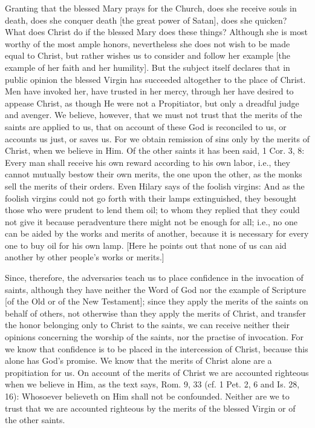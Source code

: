 Granting that the blessed Mary prays for the Church, does she receive
souls in death, does she conquer death [the great power of Satan],
does she quicken?  What does Christ do if the blessed Mary does these
things?  Although she is most worthy of the most ample honors,
nevertheless she does not wish to be made equal to Christ, but rather
wishes us to consider and follow her example [the example of her
faith and her humility].  But the subject itself declares that in
public opinion the blessed Virgin has succeeded altogether to the
place of Christ.  Men have invoked her, have trusted in her mercy,
through her have desired to appease Christ, as though He were not a
Propitiator, but only a dreadful judge and avenger.  We believe,
however, that we must not trust that the merits of the saints are
applied to us, that on account of these God is reconciled to us, or
accounts us just, or saves us.  For we obtain remission of sins only
by the merits of Christ, when we believe in Him.  Of the other saints
it has been said, 1 Cor. 3, 8: Every man shall receive his own reward
according to his own labor, i.e., they cannot mutually bestow their
own merits, the one upon the other, as the monks sell the merits of
their orders.  Even Hilary says of the foolish virgins: And as the
foolish virgins could not go forth with their lamps extinguished,
they besought those who were prudent to lend them oil; to whom they
replied that they could not give it because peradventure there might
not be enough for all; i.e., no one can be aided by the works and
merits of another, because it is necessary for every one to buy oil
for his own lamp.  [Here he points out that none of us can aid
another by other people's works or merits.]

Since, therefore, the adversaries teach us to place confidence in the
invocation of saints, although they have neither the Word of God nor
the example of Scripture [of the Old or of the New Testament]; since
they apply the merits of the saints on behalf of others, not
otherwise than they apply the merits of Christ, and transfer the
honor belonging only to Christ to the saints, we can receive neither
their opinions concerning the worship of the saints, nor the practise
of invocation.  For we know that confidence is to be placed in the
intercession of Christ, because this alone has God's promise.  We
know that the merits of Christ alone are a propitiation for us.  On
account of the merits of Christ we are accounted righteous when we
believe in Him, as the text says, Rom. 9, 33 (cf. 1 Pet. 2, 6 and Is.
28, 16): Whosoever believeth on Him shall not be confounded.  Neither
are we to trust that we are accounted righteous by the merits of the
blessed Virgin or of the other saints.

